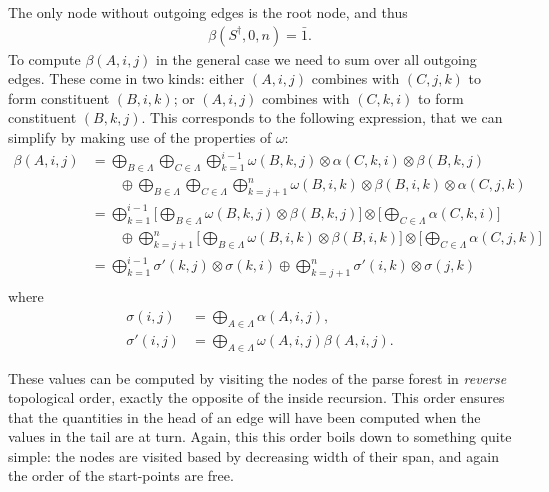     The only node without outgoing edges is the root node, and thus
    \begin{align*}
      \beta(S^{\dagger}, 0, n) = \bar{1}.
    \end{align*}
    To compute $\beta(A, i, j)$ in the general case we need to sum over all outgoing edges. These come in two kinds: either $(A, i, j)$ combines with $(C, j, k)$ to form constituent $(B, i, k)$; or $(A, i, j)$ combines with $(C, k, i)$ to form constituent $(B, k, j)$. This corresponds to the following expression, that we can simplify by making use of the properties of $\omega$:
    \begin{align*}
      \beta(A, i, j)
        &= \bigoplus_{B \in \Lambda} \bigoplus_{C \in \Lambda} \bigoplus_{k=1}^{i-1} \omega(B, k, j) \otimes \alpha(C, k, i) \otimes \beta(B, k, j) \\
          &\qquad \oplus \bigoplus_{B \in \Lambda} \bigoplus_{C \in \Lambda} \bigoplus_{k=j+1}^{n} \omega(B, i, k) \otimes \beta(B, i, k) \otimes \alpha(C, j, k) \\
        &=  \bigoplus_{k=1}^{i-1}  \Bigg[ \bigoplus_{B \in \Lambda} \omega(B, k, j)  \otimes \beta(B, k, j) \Bigg] \otimes \Bigg[ \bigoplus_{C \in \Lambda} \alpha(C, k, i) \Bigg] \\
          &\qquad \oplus \bigoplus_{k=j+1}^{n}  \Bigg[ \bigoplus_{B \in \Lambda}  \omega(B, i, k) \otimes \beta(B, i, k) \Bigg] \otimes  \Bigg[  \bigoplus_{C \in \Lambda} \alpha(C, j, k) \Bigg] \\
        &=  \bigoplus_{k=1}^{i-1}  \sigma'(k, j) \otimes \sigma(k, i) \oplus \bigoplus_{k=j+1}^{n} \sigma'(i, k) \otimes  \sigma(j, k) \\
    \end{align*}
    where
    \begin{align*}
        \sigma(i, j) &= \bigoplus_{A \in \Lambda} \alpha(A, i, j),  \\
        \sigma'(i, j) &= \bigoplus_{A \in \Lambda} \omega(A, i, j) \beta(A, i, j).
    \end{align*}

    These values can be computed by visiting the nodes of the parse forest in \textit{reverse} topological order, exactly the opposite of the inside recursion. This order ensures that the quantities in the head of an edge will have been computed when the values in the tail are at turn. Again, this this order boils down to something quite simple: the nodes are visited based by decreasing width of their span, and again the order of the start-points are free.

